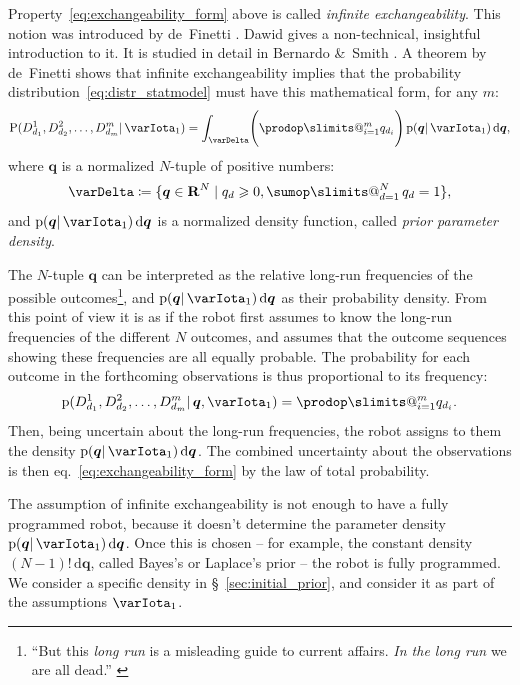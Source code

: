 \documentclass[\ifafour a4paper,12pt,\else a5paper,10pt,\fi%
onecolumn,oneside,article,%
british%
]{memoir}
\makeatletter
\theoremstyle{remark}
\theoremstyle{innote}
\def\sum{\DOTSI\sumop\slimits@}
\def\prod{\DOTSI\prodop\slimits@}
\let\parentext=\parentexttrack%
\newcommand*{\citep}{\parencites}
\newcommand*{\citey}{\parencites*}
\newcommand*{\amp}{\&}
\newcommand*{\di}{\mathrm{d}}%
\newcommand*{\RR}{\bm{\mathrm{R}}}
\newcommand*{\defd}{\coloneqq}
\newcommand*{\suchthat}{\mid}%
\renewcommand{\ge}{\geqslant}%
\DeclarePairedDelimiter\set{\{}{\}}
\newcommand*{\pf}{\mathrm{p}}%
\newcommand*{\p}{\mathrm{P}}%
\renewcommand*{\|}{\mathpunct{|}}
\newcommand*{\sect}{\S}%
\newcommand*{\eqn}{eq.}%
\newcommand*{\tsum}{\mathop{\textstyle\sum}\nolimits}
\newcommand*{\simpl}{\varDelta}
\newcommand*{\yqq}{q}
\newcommand*{\yq}{\bm{\yqq}}
\newcommand*{\yI}{\varIota}
\newcommand*{\yMJ}{\yI_1}
\makeatother
\begin{document}
Property~\eqref{eq:exchangeability_form} above is called \emph{infinite
  exchangeability}. This notion was introduced by de~Finetti
\parentext{\cite*{definetti1930,definetti1937}; \cite{heathetal1976}}.
Dawid \citey{dawid2013} gives a non-technical, insightful introduction to
it. It is studied in detail in Bernardo \amp\ Smith
\citey[\sect~4.2]{bernardoetal1994_r2000}. A theorem by de~Finetti shows
that infinite exchangeability implies that the probability
distribution~\eqref{eq:distr_statmodel} must have this mathematical form,
for any $m$:
\begin{equation}
  \label{eq:exchangeability_form}
  \p(D^1_{d_1} , D^2_{d_2} , \dotsc , D^m_{d_m} \| \yMJ) =
  \int_\simpl   \Biggl( \prod_{i=1}^m \yqq_{d_i} \Biggr)\, \pf(\yq \| \yMJ)\,\di\yq,
\end{equation}
where $\yq$ is a normalized $N$-tuple of positive numbers:
\begin{equation}
\simpl \defd \set{\yq \in \RR^N \suchthat \yqq_d\ge0,
  \tsum_{d=1}^N\yqq_d=1},
\label{eq:simplex}
\end{equation}
and $\pf(\yq \| \yMJ)\,\di\yq$ is a normalized density function, called
\emph{prior parameter density}.

The $N$-tuple $\yq$ can be interpreted as the relative long-run frequencies
of the possible outcomes\footnote{\enquote{But this \emph{long run} is a
    misleading guide to current affairs. \emph{In the long run} we are all
    dead.} \citep[\sect~3.I, p.~65]{keynes1923_r2013}}, and
$\pf(\yq \| \yMJ)\,\di\yq$ as their probability density. From this point of
view it is as if the robot first assumes to know the long-run frequencies
of the different $N$ outcomes, and assumes that the outcome sequences
showing these frequencies are all equally probable. The probability for
each outcome in the forthcoming observations is thus proportional to its
frequency:
\begin{equation}
  \label{eq:param_conditional_definetti}
  \pf(D^1_{d_1} , D^2_{d_2} , \dotsc , D^m_{d_m}  \| \yq,\yMJ)
  = \prod_{i=1}^m \yqq_{d_i}.
\end{equation}
Then, being uncertain about the long-run frequencies, the robot assigns to
them the density $\pf(\yq \| \yMJ)\,\di\yq$. The combined uncertainty about
the observations is then \eqn~\eqref{eq:exchangeability_form} by the law of
total probability.

\medskip

The assumption of infinite exchangeability is not enough to have a fully
programmed robot, because it doesn't determine the parameter density
$\pf(\yq \| \yMJ)\,\di\yq$. Once this is chosen -- for example, the
constant density $(N-1)!\,\di\yq$, called Bayes's
\citey[Scholium]{bayes1763} or Laplace's \citey[p.~xvii]{laplace1814_r1819}
prior -- the robot is fully programmed. We consider a specific density in
\sect~\ref{sec:initial_prior}, and consider it as part of the assumptions
$\yMJ$.
\end{document}
